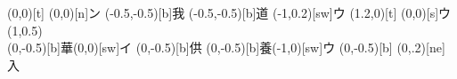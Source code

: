\documentclass[m_shidai]{subfiles}
\begin{document}
\noindent
{}%
\karifu(0,0)[t]{}
       {\cii\moji(0,0)[n]{ン}}
\karifu(-0.5,-0.5)[b]{我}
       {\ataru{\c}\kili\yurisori{\c}\modori
        \woo\長[e]\kili\woo\矢[w]\modori\woo\長[e]}
\karifu(-0.5,-0.5)[b]{道}
       {\chikara{\w}\yurikake{\c}\moji(-1,0.2)[sw]{ウ}
        \kili\yurisori{\c}\modori\woo}
\karifu(1.2,0)[t]{}
       {\sori{\w}\moji(0,0)[s]{ウ}
       \iromodori\sori{\w}\kak\kili
       \moveTo(1,0.5)\sho\kiri
       \chikara{\q}\modori\yurugu{\s}}\\
%
\karifu(0,-0.5)[b]{華}{\kak\modori\cii\kak\modori\kak\moji(0,0)[sw]{イ}}
\karifu(0,-0.5)[b]{供}{\kak\modori\cii\矢[ne]}
\karifu(0,-0.5)[b]{養}{\yurikake{\c}\moji(-1,0)[sw]{ウ}\kili\yurisori{\c}%
            \modori\woo\長[e]}
\karifu(0,-0.5)[b]{}
           {\woo{}\kili[sw]%
            \woo\modoli{}\cii\tsu\moji(0,.2)[ne]{入}}\\
\end{document}
